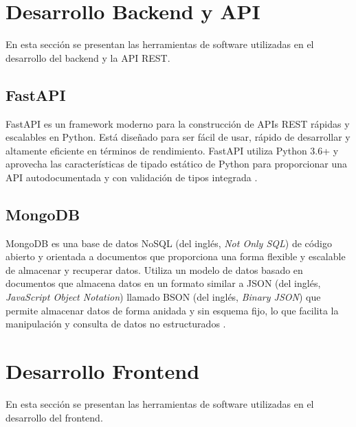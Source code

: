 
\section{Desarrollo Backend y API}

En esta sección se presentan las herramientas de software utilizadas en el
desarrollo del backend y la API REST.

\subsection{FastAPI}

FastAPI es un framework moderno para la construcción de APIs REST rápidas y
escalables en Python. Está diseñado para ser fácil de usar, rápido de
desarrollar y altamente eficiente en términos de rendimiento. FastAPI utiliza
Python 3.6+ y aprovecha las características de tipado estático de Python para
proporcionar una API autodocumentada y con validación de tipos integrada
\cite{FastAPI}.

\subsection{MongoDB}

MongoDB es una base de datos NoSQL (del inglés, \textit{Not Only SQL}) de
código abierto y orientada a documentos que proporciona una forma flexible y
escalable de almacenar y recuperar datos. Utiliza un modelo de datos basado en
documentos que almacena datos en un formato similar a JSON (del inglés,
\textit{JavaScript Object Notation}) llamado BSON (del inglés, \textit{Binary
	JSON}) que permite almacenar datos de forma anidada y sin esquema fijo, lo que
facilita la manipulación y consulta de datos no estructurados \cite{MongoDB}.


\section{Desarrollo Frontend}

En esta sección se presentan las herramientas de software utilizadas en el
desarrollo del frontend.

